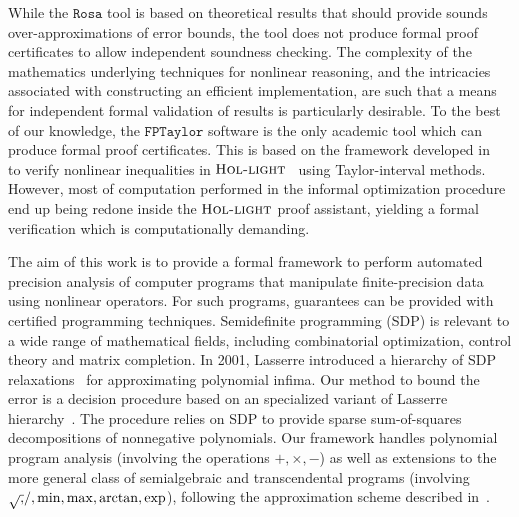 \documentclass[preprint]{sigplanconf}
\newcommand{\hol}{\text{\sc Hol-light}}
\newcommand{\rosa}{\mathtt{Rosa}}
\newcommand{\fptaylor}{\mathtt{FPTaylor}}
\theoremstyle{plain}
\begin{document}
While the $\rosa$ tool is based on theoretical results that should provide sounds over-approximations of error bounds, the tool does not produce formal proof certificates to allow independent soundness checking.  The complexity of the mathematics underlying techniques for nonlinear reasoning, and the intricacies associated with constructing an efficient implementation, are such that a means for independent formal validation of results is particularly desirable.  
To the best of our knowledge, the $\fptaylor$ software is the only academic tool which can produce formal proof certificates. This is based on the framework developed in~\cite{SolovyevH13} to verify nonlinear inequalities in $\hol$~\cite{hollight} using Taylor-interval methods. However, most of computation performed in the informal optimization procedure end up being redone inside the $\hol$ proof assistant, yielding a formal verification which is computationally demanding.

The aim of this work is to provide a formal framework to perform automated precision analysis of computer programs that manipulate finite-precision data using nonlinear operators. For such programs, guarantees can be provided with certified programming techniques.
Semidefinite programming (SDP) is relevant to a wide range of mathematical fields, including combinatorial optimization, control theory and matrix completion. In 2001, Lasserre introduced a hierarchy of SDP relaxations~\cite{Lasserre01moments} for approximating polynomial infima. Our method to bound the error is a decision procedure based on an specialized variant of Lasserre hierarchy~\cite{Las06SparseSOS}. The procedure relies on SDP to provide sparse sum-of-squares decompositions of nonnegative polynomials. Our framework handles polynomial program analysis (involving the operations $+,\times,-$) as well as extensions to the more general class of semialgebraic and transcendental programs (involving $\sqrtsign, /, \min, \max, \arctan, \exp$), following the approximation scheme described in~\cite{Magron15sdp}.
%
\end{document}

